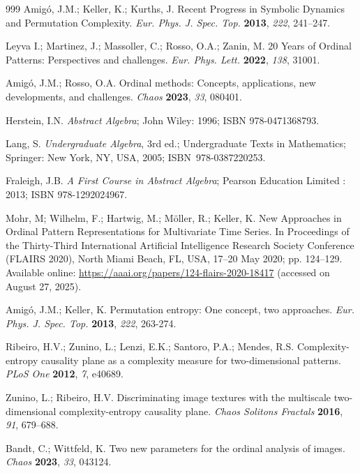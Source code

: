 \documentclass{article}
\begin{document}
\begin{thebibliography}{999}
 Amig\'{o}, J.M.; Keller, K.; Kurths, J. Recent Progress
in Symbolic Dynamics and Permutation Complexity. \emph{Eur. Phys. J. Spec. Top.} \textbf{2013}, \emph{222}, 241--247.

 Leyva I.; Martinez, J.; Massoller, C.; Rosso, O.A.;
Zanin, M. 20 Years of Ordinal Patterns: Perspectives and challenges.
\emph{Eur. Phys. Lett.} \textbf{2022}, \emph{138}, 31001.

 Amig\'{o}, J.M.; Rosso, O.A. Ordinal methods: Concepts,
applications, new developments, and challenges. \emph{Chaos} \textbf{2023}, \emph{33}, 080401.

 Herstein, I.N. \emph{Abstract Algebra}; John Wiley: 1996;  ISBN
978-0471368793.

 Lang, S. \textit{Undergraduate Algebra}, 3rd ed.; 
Undergraduate Texts in Mathematics; Springer: New York,  NY, USA, 2005; \mbox{ISBN
978-0387220253.}

 Fraleigh, J.B. \textit{A First Course in Abstract
Algebra}; Pearson Education Limited
: 2013; ISBN 978-1292024967.

 Mohr, M; Wilhelm, F.; Hartwig, M.; M\"{o}ller, R.;
Keller, K. New Approaches in Ordinal Pattern Representations for
Multivariate Time Series. In  Proceedings of the Thirty-Third International
Artificial Intelligence Research Society Conference (FLAIRS 2020), North Miami Beach, FL, USA, 17--20 May 2020; pp. 124--129.   Available online:  
\url{https://aaai.org/papers/124-flairs-2020-18417} (accessed on August 27, 2025). %

 Amig\'{o}, J.M.; Keller, K. Permutation entropy: One
concept, two approaches. \emph{Eur. Phys. J. Spec. Top.} \textbf{2013}, \emph{222}, 263-274.

 Ribeiro, H.V.; Zunino, L.; Lenzi, E.K.; Santoro, P.A.;
Mendes, R.S. Complexity-entropy causality plane as a complexity measure for
two-dimensional patterns. \emph{PLoS One} \textbf{2012}, \emph{7}, e40689.

 Zunino, L.; Ribeiro, H.V. Discriminating image textures
with the multiscale two-dimensional complexity-entropy causality plane.
\emph{Chaos Solitons Fractals} \textbf{2016}, \emph{91}, 679--688.

 Bandt, C.; Wittfeld, K. Two new parameters for the
ordinal analysis of images. \emph{Chaos} \textbf{2023}, \emph{33}, 043124.


\end{thebibliography}
\end{document}
